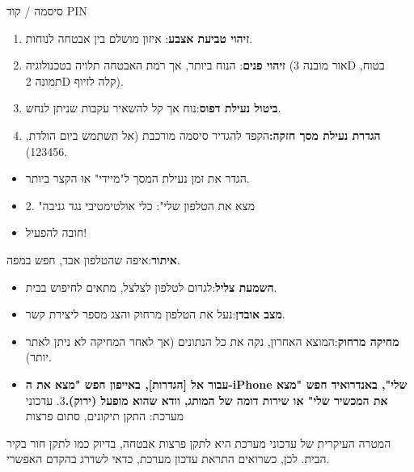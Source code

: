 


סיסמה / קוד PIN


\begin{enumerate}
  \item \textbf{זיהוי טביעת אצבע}: איזון מושלם בין אבטחה לנוחות.
  \item \textbf{זיהוי פנים}: הנוח ביותר, אך רמת האבטחה תלויה בטכנולוגיה (אור מובנה 3D בטוח, תמונה 2D קלה לזיוף).
  \item \textbf{ביטול נעילת דפוס}:נוח אך קל להשאיר עקבות שניתן לנחש.
  \item \textbf{הגדרת נעילת מסך חזקה:}הקפד להגדיר סיסמה מורכבת (אל תשתמש ביום הולדת, 123456).
\end{enumerate}


\begin{itemize}
  \item הגדר את זמן נעילת המסך ל"מיידי" או הקצר ביותר.
  \item 2. "מצא את הטלפון שלי": כלי אולטימטיבי נגד גניבה
  \item חובה להפעיל!
\end{itemize}


\textbf{איתור}:איפה שהטלפון אבד, חפש במפה.

\begin{itemize}
  \item \textbf{השמעת צליל}:לגרום לטלפון לצלצל, מתאים לחיפוש בבית.
  \item \textbf{מצב אובדן}:נעל את הטלפון מרחוק והצג מספר ליצירת קשר.
  \item \textbf{מחיקה מרחוק}:המוצא האחרון, נקה את כל הנתונים (אך לאחר המחיקה לא ניתן לאתר יותר).
  \item \textbf{עבור אל [הגדרות], באייפון חפש "מצא את ה-iPhone שלי", באנדרואיד חפש "מצא את המכשיר שלי" או שירות דומה של המותג, וודא שהוא מופעל (ירוק).}3. עדכוני מערכת: התקן תיקונים, סתום פרצות
\end{itemize}

המטרה העיקרית של עדכוני מערכת היא לתקן פרצות אבטחה, בדיוק כמו לתקן חור בקיר הבית. לכן, כשרואים התראת עדכון מערכת, כדאי לשדרג בהקדם האפשרי.

